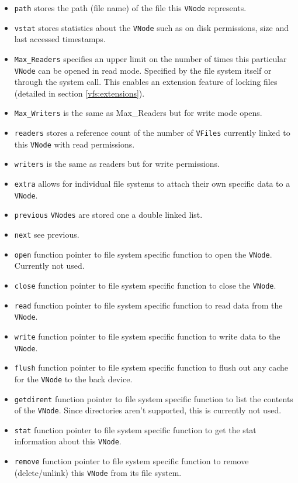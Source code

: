 \documentclass[12pt,english]{article}
\begin{document}
\begin{itemize}
\item \texttt{path} stores the path (file name) of the file this \texttt{VNode} represents.
\item \texttt{vstat} stores statistics about the \texttt{VNode} such as on disk permissions, size and last accessed timestamps.
\item \texttt{Max\_Readers} specifies an upper limit on the number of times this particular \texttt{VNode} can be opened in read mode. Specified by the file system itself or through the system call. This enables an extension feature of locking files (detailed in section \ref{vfs:extensions}).
\item \texttt{Max\_Writers} is the same as Max\_Readers but for write mode opens.
\item \texttt{readers} stores a reference count of the number of \texttt{VFiles} currently linked to this \texttt{VNode} with read permissions.
\item \texttt{writers} is the same as readers but for write permissions.
\item \texttt{extra} allows for individual file systems to attach their own specific data to a \texttt{VNode}.
\item \texttt{previous} \texttt{VNodes} are stored one a double linked list.
\item \texttt{next} see previous.
\item \texttt{open} function pointer to file system specific function to open the \texttt{VNode}. Currently not used.
\item \texttt{close} function pointer to file system specific function to close the \texttt{VNode}.
\item \texttt{read} function pointer to file system specific function to read data from the \texttt{VNode}.
\item \texttt{write} function pointer to file system specific function to write data to the \texttt{VNode}.
\item \texttt{flush} function pointer to file system specific function to flush out any cache for the \texttt{VNode} to the back device.
\item \texttt{getdirent} function pointer to file system specific function to list the contents of the \texttt{VNode}. Since directories aren't supported, this is currently not used.
\item \texttt{stat} function pointer to file system specific function to get the stat information about this \texttt{VNode}.
\item \texttt{remove} function pointer to file system specific function to remove (delete/unlink) this \texttt{VNode} from its file system.
\end{itemize}
\end{document}
